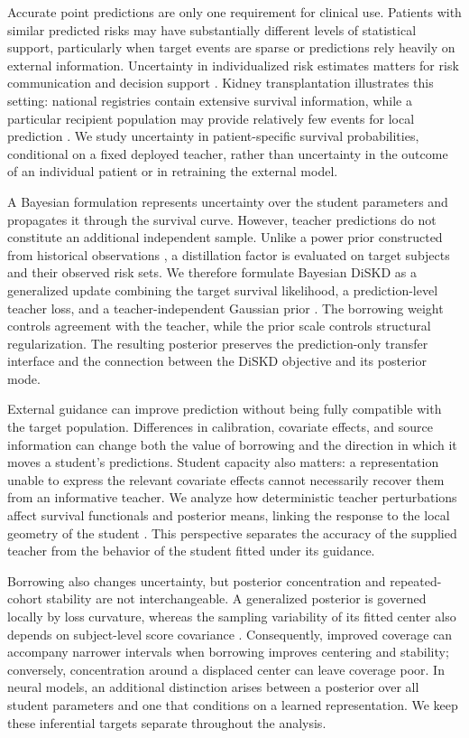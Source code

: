\documentclass{article} %
\begin{document}
Accurate point predictions are only one requirement for clinical use. Patients with similar predicted risks may have substantially different levels of statistical support, particularly when target events are sparse or predictions rely heavily on external information. Uncertainty in individualized risk estimates matters for risk communication and decision support \citep{riley2025uncertainty,kompa2021second}. Kidney transplantation illustrates this setting: national registries contain extensive survival information, while a particular recipient population may provide relatively few events for local prediction \citep{salaun2024kidney}. We study uncertainty in patient-specific survival probabilities, conditional on a fixed deployed teacher, rather than uncertainty in the outcome of an individual patient or in retraining the external model.

A Bayesian formulation represents uncertainty over the student parameters and propagates it through the survival curve. However, teacher predictions do not constitute an additional independent sample. Unlike a power prior constructed from historical observations \citep{chen2000powerprior,ibrahim2015powerprior}, a distillation factor is evaluated on target subjects and their observed risk sets. We therefore formulate Bayesian DiSKD as a generalized update combining the target survival likelihood, a prediction-level teacher loss, and a teacher-independent Gaussian prior \citep{bissiri2016general,fang2024bkd}. The borrowing weight controls agreement with the teacher, while the prior scale controls structural regularization. The resulting posterior preserves the prediction-only transfer interface and the connection between the DiSKD objective and its posterior mode.

External guidance can improve prediction without being fully compatible with the target population. Differences in calibration, covariate effects, and source information can change both the value of borrowing and the direction in which it moves a student's predictions. Student capacity also matters: a representation unable to express the relevant covariate effects cannot necessarily recover them from an informative teacher. We analyze how deterministic teacher perturbations affect survival functionals and posterior means, linking the response to the local geometry of the student \citep{gustafson1996sensitivity}. This perspective separates the accuracy of the supplied teacher from the behavior of the student fitted under its guidance.

Borrowing also changes uncertainty, but posterior concentration and repeated-cohort stability are not interchangeable. A generalized posterior is governed locally by loss curvature, whereas the sampling variability of its fitted center also depends on subject-level score covariance \citep{miller2021,shaby2014,syring2019calibrating}. Consequently, improved coverage can accompany narrower intervals when borrowing improves centering and stability; conversely, concentration around a displaced center can leave coverage poor. In neural models, an additional distinction arises between a posterior over all student parameters and one that conditions on a learned representation. We keep these inferential targets separate throughout the analysis.
\end{document}
